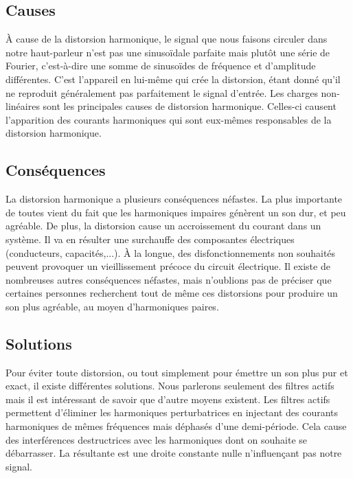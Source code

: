 \subsection{Causes}
À cause de la distorsion harmonique, le signal que nous faisons circuler dans notre haut-parleur n'est pas
une sinusoïdale parfaite mais plutôt une série de Fourier, c'est-à-dire une somme de sinusoïdes de 
fréquence et d'amplitude différentes. C'est l'appareil en lui-même qui crée la distorsion, étant donné 
qu'il ne reproduit généralement pas parfaitement le signal d'entrée. 
Les charges non-linéaires sont les principales causes de distorsion harmonique. Celles-ci causent 
l'apparition des courants harmoniques qui sont eux-mêmes responsables de la distorsion harmonique.

\subsection{Conséquences}
La distorsion harmonique a plusieurs conséquences néfastes.
La plus importante de toutes vient du fait que les harmoniques impaires génèrent un son dur, et peu agréable. De plus, la distorsion cause un accroissement 
du courant dans un système. Il va en résulter une surchauffe des composantes électriques (conducteurs, 
capacités,...). À la longue, des disfonctionnements non souhaités peuvent provoquer un vieillissement 
précoce du circuit électrique. Il existe de nombreuses autres conséquences néfastes, mais n'oublions pas de préciser que certaines personnes recherchent tout de même ces distorsions pour produire un son plus agréable, au moyen d'harmoniques paires.

\subsection{Solutions}
Pour éviter toute distorsion, ou tout simplement pour émettre un son plus pur et exact, 
il existe différentes solutions. Nous parlerons seulement des filtres actifs 
mais il est intéressant de savoir que d'autre moyens existent.
Les filtres actifs permettent d'éliminer les harmoniques perturbatrices en injectant des courants
harmoniques de mêmes fréquences mais déphasés d'une demi-période. Cela cause des interférences
destructrices avec les harmoniques dont on souhaite se débarrasser. La résultante est une droite constante
nulle n'influençant pas notre signal.


